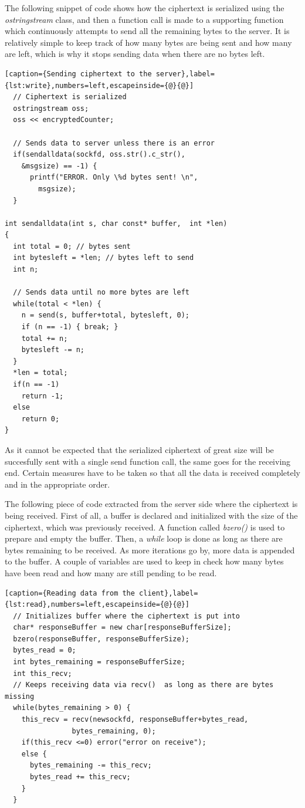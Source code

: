 The following snippet of code shows how the ciphertext is serialized using the \textit{ostringstream} class, and then a function call is made to a supporting function which continuously attempts to send all the remaining bytes to the server. It is relatively simple to keep track of how many bytes are being sent and how many are left, which is why it stops sending data when there are no bytes left.
\begin{lstlisting}[caption={Sending ciphertext to the server},label={lst:write},numbers=left,escapeinside={@}{@}]
  // Ciphertext is serialized
  ostringstream oss;
  oss << encryptedCounter;
  
  // Sends data to server unless there is an error
  if(sendalldata(sockfd, oss.str().c_str(), 
    &msgsize) == -1) {
      printf("ERROR. Only \%d bytes sent! \n", 
        msgsize);
  }

int sendalldata(int s, char const* buffer,  int *len)
{
  int total = 0; // bytes sent
  int bytesleft = *len; // bytes left to send
  int n;
  
  // Sends data until no more bytes are left
  while(total < *len) {
    n = send(s, buffer+total, bytesleft, 0);
    if (n == -1) { break; }
    total += n;
    bytesleft -= n;
  }
  *len = total; 
  if(n == -1) 
    return -1;
  else 
    return 0;
}
\end{lstlisting}

As it cannot be expected that the serialized ciphertext of great size will be succesfully sent with a single send function call, the same goes for the receiving end. Certain measures have to be taken so that all the data is received completely and in the appropriate order.

The following piece of code extracted from the server side where the ciphertext is being received. First of all, a buffer is declared and initialized with the size of the ciphertext, which was previously received. A function called \textit{bzero()} is used to prepare and empty the buffer. Then, a \textit{while} loop is done as long as there are bytes remaining to be received. As more iterations go by, more data is appended to the buffer. A couple of variables are used to keep in check how many bytes have been read and how many are still pending to be read.

\begin{lstlisting}[caption={Reading data from the client},label={lst:read},numbers=left,escapeinside={@}{@}]
  // Initializes buffer where the ciphertext is put into
  char* responseBuffer = new char[responseBufferSize];
  bzero(responseBuffer, responseBufferSize);
  bytes_read = 0;
  int bytes_remaining = responseBufferSize;
  int this_recv;
  // Keeps receiving data via recv()  as long as there are bytes missing
  while(bytes_remaining > 0) {    
    this_recv = recv(newsockfd, responseBuffer+bytes_read,
                bytes_remaining, 0); 
    if(this_recv <=0) error("error on receive");
    else {
      bytes_remaining -= this_recv;
      bytes_read += this_recv;
    }
  }
\end{lstlisting}

